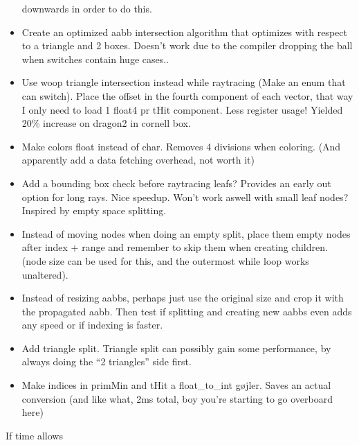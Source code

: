 \begin{itemize}
  downwards in order to do this.
\item Create an optimized aabb intersection algorithm that
optimizes with respect to a triangle and 2 boxes. Doesn't work due to
the compiler dropping the ball when switches contain huge cases..
\item Use woop triangle intersection instead while raytracing (Make an
  enum that can switch). Place the offset in the fourth component of
  each vector, that way I only need to load 1 float4 pr tHit
  component. Less register usage! Yielded 20\% increase on dragon2 in
  cornell box.
\item Make colors float instead of char. Removes 4 divisions when
  coloring. (And apparently add a data fetching overhead, not worth
  it)
\item Add a bounding box check before raytracing leafs? Provides an
  early out option for long rays. Nice speedup. Won't work aswell with
  small leaf nodes? Inspired by empty space splitting.
\item Instead of moving nodes when doing an empty split, place them
  empty nodes after index + range and remember to skip them when
  creating children. (node size can be used for this, and the
  outermost while loop works unaltered).

\color{red}
\item Instead of resizing aabbs, perhaps just use the original size
  and crop it with the propagated aabb. Then test if splitting and
  creating new aabbs even adds any speed or if indexing is faster.
\item Add triangle split. Triangle split can possibly gain
  some performance, by always doing the ``2 triangles'' side first.
\item Make indices in primMin and tHit a float\_to\_int gøjler. Saves
  an actual conversion (and like what, 2ms total, boy you're starting
  to go overboard here)
\end{itemize}

If time allows

